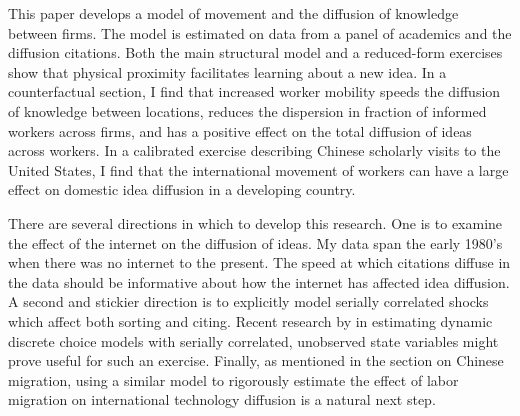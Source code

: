 This paper develops a model of movement and the diffusion of knowledge
between firms. The model is estimated on data from a panel of academics
and the diffusion citations. Both the main structural model and
a reduced-form exercises show that physical proximity facilitates learning
 about a new idea. In a counterfactual section, I find that increased worker mobility
 speeds the diffusion of knowledge between locations, reduces 
the dispersion in fraction of informed workers across firms, and has a
positive effect on the total diffusion of ideas across workers.
In a calibrated exercise describing Chinese scholarly visits to the United
States, I find that the international movement of workers can have a large 
effect on domestic idea diffusion in a developing country.

There are several directions in which to develop this research.  One is to examine the effect of the internet on the diffusion of ideas.  My data span the early 1980's when there was no internet to the present.  The speed at which citations diffuse in the data should be informative about how the internet has affected idea diffusion.  A second and stickier direction is to explicitly model serially correlated shocks which affect both sorting and citing.  Recent research by \citet{arcidiacono2011conditional} in estimating dynamic discrete choice models with serially correlated, unobserved state variables might prove useful for such an exercise.  Finally, as mentioned in the section on Chinese migration, using a similar model to rigorously estimate the effect of labor migration on international technology diffusion is a natural next step.
